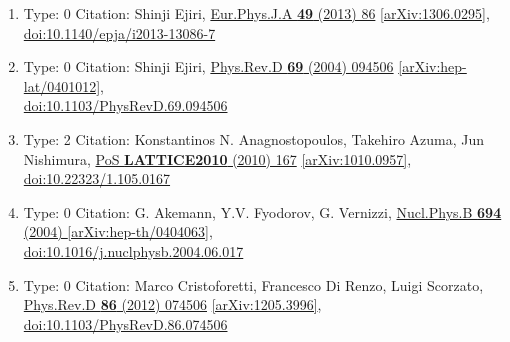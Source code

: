 \documentclass[a4paper,10pt]{article}
\begin{document}
\begin{enumerate}
\begin{enumerate}
  \item Type: 0 Citation: Shinji Ejiri, \href{https://www.doi.org/10.1140/epja/i2013-13086-7}{Eur.Phys.J.A {\bf 49} (2013) 86}  \href{https://arxiv.org/abs/1306.0295}{[arXiv:1306.0295]},\\\href{https://www.doi.org/10.1140/epja/i2013-13086-7}{doi:10.1140/epja/i2013-13086-7}
  \item Type: 0 Citation: Shinji Ejiri, \href{https://www.doi.org/10.1103/PhysRevD.69.094506}{Phys.Rev.D {\bf 69} (2004) 094506}  \href{https://arxiv.org/abs/hep-lat/0401012}{[arXiv:hep-lat/0401012]},\\\href{https://www.doi.org/10.1103/PhysRevD.69.094506}{doi:10.1103/PhysRevD.69.094506}
  \item Type: 2 Citation: Konstantinos N. Anagnostopoulos, Takehiro Azuma, Jun Nishimura, \href{https://www.doi.org/10.22323/1.105.0167}{PoS {\bf LATTICE2010} (2010) 167}  \href{https://arxiv.org/abs/1010.0957}{[arXiv:1010.0957]},\\\href{https://www.doi.org/10.22323/1.105.0167}{doi:10.22323/1.105.0167}
  \item Type: 0 Citation: G. Akemann, Y.V. Fyodorov, G. Vernizzi, \href{https://www.doi.org/10.1016/j.nuclphysb.2004.06.017}{Nucl.Phys.B {\bf 694} (2004) }  \href{https://arxiv.org/abs/hep-th/0404063}{[arXiv:hep-th/0404063]},\\\href{https://www.doi.org/10.1016/j.nuclphysb.2004.06.017}{doi:10.1016/j.nuclphysb.2004.06.017}
  \item Type: 0 Citation: Marco Cristoforetti, Francesco Di Renzo, Luigi Scorzato, \href{https://www.doi.org/10.1103/PhysRevD.86.074506}{Phys.Rev.D {\bf 86} (2012) 074506}  \href{https://arxiv.org/abs/1205.3996}{[arXiv:1205.3996]},\\\href{https://www.doi.org/10.1103/PhysRevD.86.074506}{doi:10.1103/PhysRevD.86.074506}

\end{enumerate}
\end{enumerate}
\end{document}
